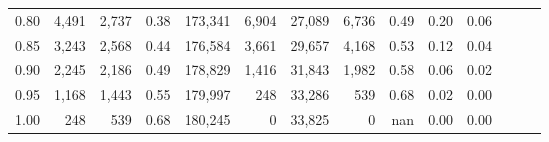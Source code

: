 \begin{tabular}{rrrrrrrrrrrrrr}
0.80 &   4,491 &  2,737 &  0.38 &  173,341 &    6,904 &  27,089 &   6,736 &  0.49 &  0.20 &      0.06 \\
0.85 &   3,243 &  2,568 &  0.44 &  176,584 &    3,661 &  29,657 &   4,168 &  0.53 &  0.12 &      0.04 \\
0.90 &   2,245 &  2,186 &  0.49 &  178,829 &    1,416 &  31,843 &   1,982 &  0.58 &  0.06 &      0.02 \\
0.95 &   1,168 &  1,443 &  0.55 &  179,997 &      248 &  33,286 &     539 &  0.68 &  0.02 &      0.00 \\
1.00 &     248 &    539 &  0.68 &  180,245 &        0 &  33,825 &       0 &   nan &  0.00 &      0.00 \\
\bottomrule
\end{tabular}
